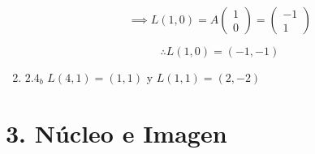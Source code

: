 \documentclass{article}
\begin{document}
\begin{enumerate}
			\begin{equation*}
				\implies L(1,0)=A
				\begin{pmatrix}
					1 \\
					0
				\end{pmatrix}
				=
				\begin{pmatrix}
					-1 \\
					1
				\end{pmatrix}
			\end{equation*}
			
			\begin{equation*}
				\boxed{\therefore L(1,0)=(-1,-1)}
			\end{equation*}
			
			\item \(2.4_b\) \(L(4,1)=(1,1)\) y \(L(1,1)=(2,-2)\)
			
		\end{enumerate}
		
		\section*{3. Núcleo e Imagen}
		
\end{document}
